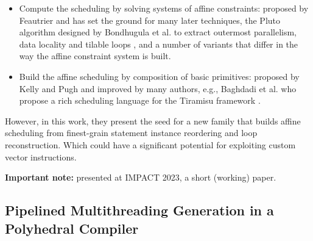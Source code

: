 \begin{itemize}
    \item Compute the scheduling by solving systems of affine constraints: proposed by Feautrier \cite{feautrier1992some} and has set the ground for many later techniques, the Pluto algorithm designed by Bondhugula et al. to extract outermost parallelism, data locality and tilable loops \cite{bondhugula2008practical}, and a number of variants that differ in the way the affine constraint system is built.
    \item Build the affine scheduling by composition of basic primitives: proposed by Kelly and Pugh \cite{kelly1998framework} and improved by many authors, e.g., Baghdadi et al. who propose a rich scheduling language for the Tiramisu framework \cite{baghdadi2019tiramisu}. 
\end{itemize}
However, in this work, they present the seed for a new family that builds affine scheduling from finest-grain statement instance reordering and loop reconstruction. Which could have a significant potential for exploiting custom vector instructions.

\textbf{Important note:} presented at IMPACT 2023, a short (working) paper.

\subsection{Pipelined Multithreading Generation in a Polyhedral Compiler}

